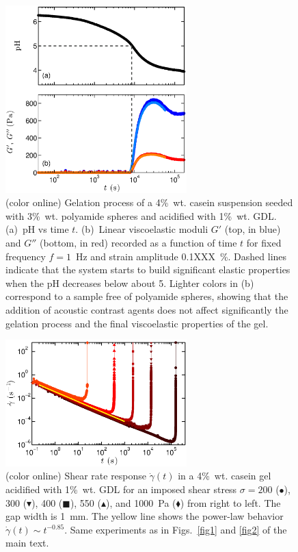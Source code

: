 \documentclass[twocolumn,superscriptaddress,showpacs,preprintnumbers,amsmath,amssymb,prl]{revtex4}
\newcommand\gp{\dot\gamma}
\begin{document}
\begin{figure}[h]
\centering
\includegraphics[width=7cm,clip]{SuppFig1.eps}
\caption{(color online) Gelation process of a 4\%~wt. casein suspension seeded with 3\%~wt. polyamide spheres and acidified with 1\%~wt. GDL. (a)~pH vs time $t$. (b)~Linear viscoelastic moduli $G'$ (top, in blue) and $G''$ (bottom, in red) recorded as a function of time $t$ for fixed frequency $f=1$~Hz and strain amplitude 0.1XXX~\%. Dashed lines indicate that the system starts to build significant elastic properties when the pH decreases below about 5. Lighter colors in (b) correspond to a sample free of polyamide spheres, showing that the addition of acoustic contrast agents does not affect significantly the gelation process and the final viscoelastic properties of the gel.
\label{suppfig1}}
\end{figure} 

\begin{figure}[h]
\centering
\includegraphics[width=7cm,clip]{SuppFig2.eps}
\caption{(color online) Shear rate response $\gp(t)$ in a 4\%~wt. casein gel acidified with 1\%~wt. GDL for an imposed shear stress $\sigma=200$ ($\bullet$), 300 ($\blacktriangledown$), 400 ($\blacksquare$), 550 ($\blacktriangle$), and 1000~Pa ($\blacklozenge$) from right to left. The gap width is 1~mm. The yellow line shows the power-law behavior $\gp(t)\sim t^{-0.85}$. Same experiments as in Figs.~\ref{fig1} and \ref{fig2} of the main text.
\label{suppfig2}}
\end{figure} 
\end{document}
